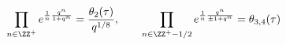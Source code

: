 \begin{equation}
\prod_{n\in\ZZ^+}e^{\frac{1}{n}\frac{q^n}{1+q^n}} =
\frac{\theta_2(\tau)}{q^{1/8}},\ \ \ \ \ \
\prod_{n\in\ZZ^+-1/2}e^{\frac{1}{n}\frac{q^n}{\pm 1+q^n}} = \theta_{3,4}(\tau)
\end{equation}

